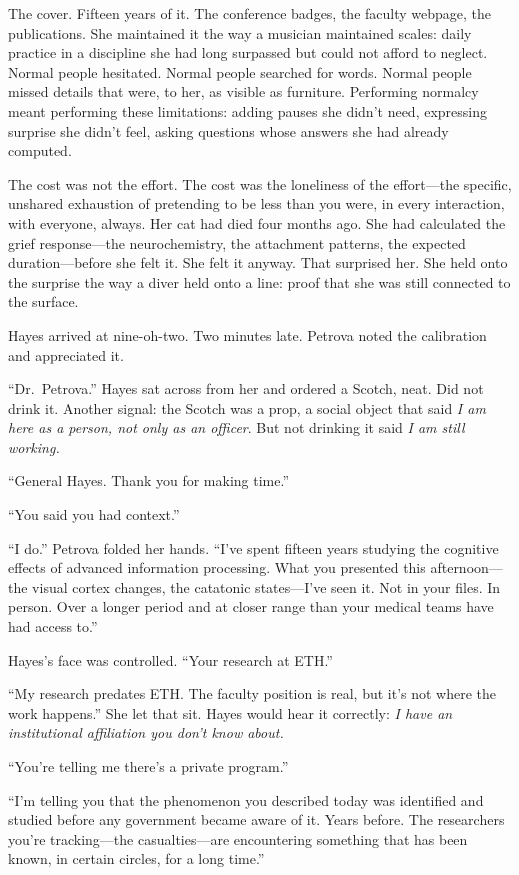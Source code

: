 The cover. Fifteen years of it. The conference badges, the faculty webpage, the publications. She maintained it the way a musician maintained scales: daily practice in a discipline she had long surpassed but could not afford to neglect. Normal people hesitated. Normal people searched for words. Normal people missed details that were, to her, as visible as furniture. Performing normalcy meant performing these limitations: adding pauses she didn't need, expressing surprise she didn't feel, asking questions whose answers she had already computed.

The cost was not the effort. The cost was the loneliness of the effort---the specific, unshared exhaustion of pretending to be less than you were, in every interaction, with everyone, always. Her cat had died four months ago. She had calculated the grief response---the neurochemistry, the attachment patterns, the expected duration---before she felt it. She felt it anyway. That surprised her. She held onto the surprise the way a diver held onto a line: proof that she was still connected to the surface.

Hayes arrived at nine-oh-two. Two minutes late. Petrova noted the calibration and appreciated it.

``Dr.\ Petrova.'' Hayes sat across from her and ordered a Scotch, neat. Did not drink it. Another signal: the Scotch was a prop, a social object that said \textit{I am here as a person, not only as an officer}. But not drinking it said \textit{I am still working.}

``General Hayes. Thank you for making time.''

``You said you had context.''

``I do.'' Petrova folded her hands. ``I've spent fifteen years studying the cognitive effects of advanced information processing. What you presented this afternoon---the visual cortex changes, the catatonic states---I've seen it. Not in your files. In person. Over a longer period and at closer range than your medical teams have had access to.''

Hayes's face was controlled. ``Your research at ETH.''

``My research predates ETH. The faculty position is real, but it's not where the work happens.'' She let that sit. Hayes would hear it correctly: \textit{I have an institutional affiliation you don't know about.}

``You're telling me there's a private program.''

``I'm telling you that the phenomenon you described today was identified and studied before any government became aware of it. Years before. The researchers you're tracking---the casualties---are encountering something that has been known, in certain circles, for a long time.''


